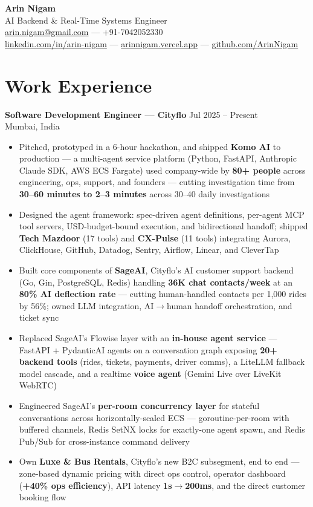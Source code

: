 \documentclass[10pt]{article}
\newcommand{\role}[4]{%
  \textbf{#1 --- #2} \hfill #3\\
  {\small #4}\vspace{-2pt}}
\begin{document}
\begin{center}
  {\huge\bfseries Arin Nigam}\\[2pt]
  AI Backend \& Real-Time Systems Engineer\\[2pt]
  \href{mailto:arin.nigam@gmail.com}{arin.nigam@gmail.com} \;---\; +91-7042052330\\
  \href{https://linkedin.com/in/arin-nigam}{linkedin.com/in/arin-nigam} \;---\;
  \href{https://arinnigam.vercel.app}{arinnigam.vercel.app} \;---\;
  \href{https://github.com/ArinNigam}{github.com/ArinNigam}
\end{center}

\vspace{-4pt}
\section{Work Experience}

\role{Software Development Engineer}{Cityflo}{Jul 2025 -- Present}{Mumbai, India}
\begin{itemize}
  \item Pitched, prototyped in a 6-hour hackathon, and shipped \textbf{Komo AI} to production --- a multi-agent service platform (Python, FastAPI, Anthropic Claude SDK, AWS ECS Fargate) used company-wide by \textbf{80+ people} across engineering, ops, support, and founders --- cutting investigation time from \textbf{30--60 minutes to 2--3 minutes} across 30--40 daily investigations
  \item Designed the agent framework: spec-driven agent definitions, per-agent MCP tool servers, USD-budget-bound execution, and bidirectional handoff; shipped \textbf{Tech Mazdoor} (17 tools) and \textbf{CX-Pulse} (11 tools) integrating Aurora, ClickHouse, GitHub, Datadog, Sentry, Airflow, Linear, and CleverTap
  \item Built core components of \textbf{SageAI}, Cityflo's AI customer support backend (Go, Gin, PostgreSQL, Redis) handling \textbf{36K chat contacts/week} at an \textbf{80\% AI deflection rate} --- cutting human-handled contacts per 1,000 rides by 56\%; owned LLM integration, AI$\to$human handoff orchestration, and ticket sync
  \item Replaced SageAI's Flowise layer with an \textbf{in-house agent service} --- FastAPI + PydanticAI agents on a conversation graph exposing \textbf{20+ backend tools} (rides, tickets, payments, driver comms), a LiteLLM fallback model cascade, and a realtime \textbf{voice agent} (Gemini Live over LiveKit WebRTC)
  \item Engineered SageAI's \textbf{per-room concurrency layer} for stateful conversations across horizontally-scaled ECS --- goroutine-per-room with buffered channels, Redis SetNX locks for exactly-one agent spawn, and Redis Pub/Sub for cross-instance command delivery
  \item Own \textbf{Luxe \& Bus Rentals}, Cityflo's new B2C subsegment, end to end --- zone-based dynamic pricing with direct ops control, operator dashboard (\textbf{+40\% ops efficiency}), API latency \textbf{1s$\to$200ms}, and the direct customer booking flow
\end{itemize}
\end{document}
